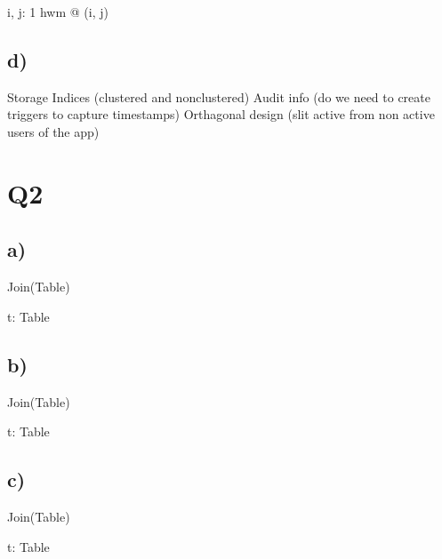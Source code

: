 \documentclass{article}
\begin{document}
\begin{zed}
\forall i, j: 1 \upto hwm @ (i, j)
\end{zed}

\subsection*{\small d)}

Storage
\newline
Indices (clustered and nonclustered)
\newline
Audit info (do we need to create triggers to capture timestamps)
\newline
Orthagonal design (slit active from non active users of the app)

\pagebreak 
\section*{Q2}

\subsection*{\small a)}

\begin{zed}
Join(Table)
\end{zed}

\begin{zed}
\forall t: Table
\end{zed}
    

\subsection*{\small b)}

\begin{zed}
Join(Table)
\end{zed}

\begin{zed}
\forall t: Table
\end{zed}

\subsection*{\small c)}

\begin{zed}
Join(Table)
\end{zed}

\begin{zed}
\forall t: Table
\end{zed}
\end{document}
